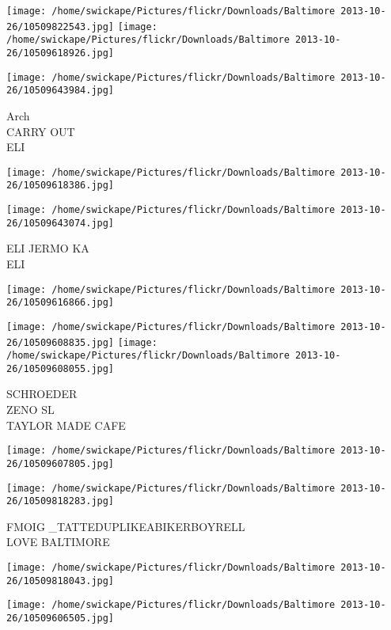 \documentclass[10pt,letterpaper]{article}
\begin{document}
\texttt{[image: /home/swickape/Pictures/flickr/Downloads/Baltimore 2013-10-26/10509822543.jpg]}
\texttt{[image: /home/swickape/Pictures/flickr/Downloads/Baltimore 2013-10-26/10509618926.jpg]}

\texttt{[image: /home/swickape/Pictures/flickr/Downloads/Baltimore 2013-10-26/10509643984.jpg]}

Arch\\
CARRY OUT\\
ELI\\
\pagebreak

\texttt{[image: /home/swickape/Pictures/flickr/Downloads/Baltimore 2013-10-26/10509618386.jpg]}

\vspace{0.25in}
\texttt{[image: /home/swickape/Pictures/flickr/Downloads/Baltimore 2013-10-26/10509643074.jpg]}

ELI JERMO KA\\
ELI\\
\pagebreak

\texttt{[image: /home/swickape/Pictures/flickr/Downloads/Baltimore 2013-10-26/10509616866.jpg]}

\vspace{0.25in}
\texttt{[image: /home/swickape/Pictures/flickr/Downloads/Baltimore 2013-10-26/10509608835.jpg]}
\texttt{[image: /home/swickape/Pictures/flickr/Downloads/Baltimore 2013-10-26/10509608055.jpg]}

SCHROEDER\\
ZENO SL\\
TAYLOR MADE CAFE\\
\pagebreak

\texttt{[image: /home/swickape/Pictures/flickr/Downloads/Baltimore 2013-10-26/10509607805.jpg]}

\vspace{0.25in}
\texttt{[image: /home/swickape/Pictures/flickr/Downloads/Baltimore 2013-10-26/10509818283.jpg]}

FMOIG \_TATTEDUPLIKEABIKERBOYRELL\\
LOVE BALTIMORE\\
\pagebreak

\texttt{[image: /home/swickape/Pictures/flickr/Downloads/Baltimore 2013-10-26/10509818043.jpg]}

\vspace{0.25in}
\texttt{[image: /home/swickape/Pictures/flickr/Downloads/Baltimore 2013-10-26/10509606505.jpg]}
\end{document}
